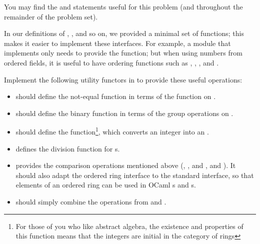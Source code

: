 \documentclass{pset}
\begin{document}
You may find the  and  statements useful for this
problem (and throughout the remainder of the problem set).

In our definitions of , ,  and so on, we
provided a minimal set of functions; this makes it easier to implement
these interfaces.  For example, a module that implements 
only needs to provide the  function; but when using numbers
from ordered fields, it is useful to have ordering functions such as \code{(>)},
\code{(<)}, \code{(>=)}, and \code{(<=)}.

Implement the following utility functors in
 to provide these useful operations:
\begin{itemize}
\item {} should define the not-equal
      function \code{(<>)} in terms of the \code{(===)} function on .
\item {} should define the binary \code{(-)}
      function in terms of the group operations on .
\item {} should define the 
      function\footnote{For those of you who like abstract algebra, the existence
      and properties of this function means that the integers are initial in
      the category of rings}, which converts an integer into an
      .
\item {} defines the division function for
      s.
\item {} provides the comparison
      operations mentioned above (\code{(<)}, \code{(>)}, \code{(<=)} and
      \code{(>=)},  and ).  It should also adapt the
      ordered ring interface to the standard  interface,
      so that elements of an ordered ring can be used in OCaml s and
      s.
\item {} should simply combine
      the operations from  and .
\end{itemize}
\end{document}
